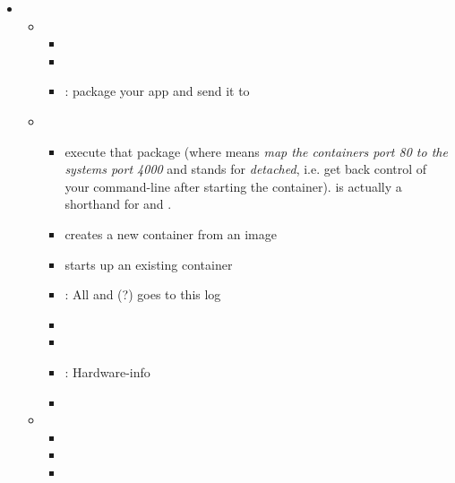 \begin{itemize}
    \item {} \begin{itemize}
        \item {} \begin{itemize}
                \item {}
                \item {}
                \item {}: package your app and send it to 
            \end{itemize}
        \item {} \begin{itemize}
                \item {}execute that package
                    (where  means \emph{map the containers port 80 to the systems port 4000} and  stands for \emph{detached},
                    i.e. get back control of your command-line after starting the container).  is actually a shorthand for  and .
                \item {} creates a new container from an image
                \item {} starts up an existing container
                \item {}: All  and  (?) goes to this log
                \item {}
                \item {}
                \item {}: Hardware-info
                \item {}
            \end{itemize}
        \item {} \begin{itemize}
                \item {}
                \item {}
                \item {}

\end{itemize}
\end{itemize}
\end{itemize}
